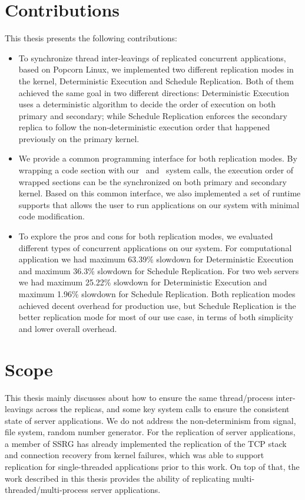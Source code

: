 
\section{Contributions}

This thesis presents the following contributions:

\begin{itemize}
\item To synchronize thread inter-leavings of replicated concurrent applications, based on Popcorn Linux, we implemented two different replication modes in the kernel, Deterministic Execution and Schedule Replication. Both of them achieved the same goal in two different directions: Deterministic Execution uses a deterministic algorithm to decide the order of execution on both primary and secondary; while Schedule Replication enforces the secondary replica to follow the non-deterministic execution order that happened previously on the primary kernel.

\item We provide a common programming interface for both replication modes. By wrapping a code section with our \detstart\ and \detend\ system calls, the execution order of wrapped sections can be the synchronized on both primary and secondary kernel. Based on this common interface, we also implemented a set of runtime supports that allows the user to run applications on our system with minimal code modification.

\item To explore the pros and cons for both replication modes, we evaluated different types of concurrent applications on our system. For computational application we had maximum 63.39\% slowdown for Deterministic Execution and maximum 36.3\% slowdown for Schedule Replication. For two web servers we had maximum 25.22\% slowdown for Deterministic Execution and maximum 1.96\% slowdown for Schedule Replication. Both replication modes achieved decent overhead for production use, but Schedule Replication is the better replication mode for most of our use case, in terms of both simplicity and lower overall overhead.
\end{itemize}

\section{Scope}
This thesis mainly discusses about how to ensure the same thread/process inter-leavings across the replicas, and some key system calls to ensure the consistent state of server applications. We do not address the non-determinism from signal, file system, random number generator. For the replication of server applications, a member of SSRG has already implemented the replication of the TCP stack and connection recovery from kernel failures, which was able to support replication for single-threaded applications prior to this work. On top of that, the work described in this thesis provides the ability of replicating multi-threaded/multi-process server applications.

